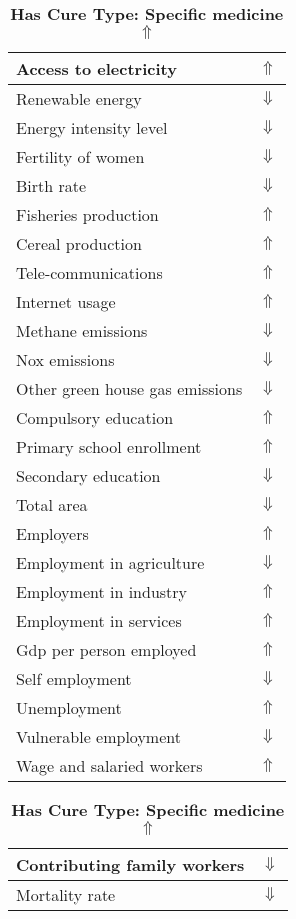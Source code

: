 \documentclass[12pt,notitlepage,oneside]{report}
\begin{document}
\begin{table}[!htb]
\caption{\textbf{Has Cure Type: Specific medicine$ \Uparrow$}}
\centering
\label{Correlated Socio-economic Factors0}
\begin{tabular}{|l|l|}
\hline
Access to electricity & $\Uparrow$\\ \hline
Renewable energy & $\Downarrow$\\ \hline
Energy intensity level & $\Downarrow$\\ \hline
Fertility of women & $\Downarrow$\\ \hline
Birth rate & $\Downarrow$\\ \hline
Fisheries production & $\Uparrow$\\ \hline
Cereal production & $\Uparrow$\\ \hline
Tele-communications & $\Uparrow$\\ \hline
Internet usage & $\Uparrow$\\ \hline
Methane emissions & $\Downarrow$\\ \hline
Nox emissions & $\Downarrow$\\ \hline
Other green house gas emissions & $\Downarrow$\\ \hline
Compulsory education & $\Uparrow$\\ \hline
Primary school enrollment & $\Uparrow$\\ \hline
Secondary education & $\Downarrow$\\ \hline
Total area & $\Downarrow$\\ \hline
Employers & $\Uparrow$\\ \hline
Employment in agriculture & $\Downarrow$\\ \hline
Employment in industry & $\Uparrow$\\ \hline
Employment in services & $\Uparrow$\\ \hline
Gdp per person employed & $\Uparrow$\\ \hline
Self employment & $\Downarrow$\\ \hline
Unemployment & $\Uparrow$\\ \hline
Vulnerable employment & $\Downarrow$\\ \hline
Wage and salaried workers & $\Uparrow$\\ \hline
\end{tabular}
\begin{tabular}{|l|l|}
\hline
Contributing family workers & $\Downarrow$\\ \hline
Mortality rate & $\Downarrow$\\ \hline

\end{tabular}
\end{table}
\end{document}
